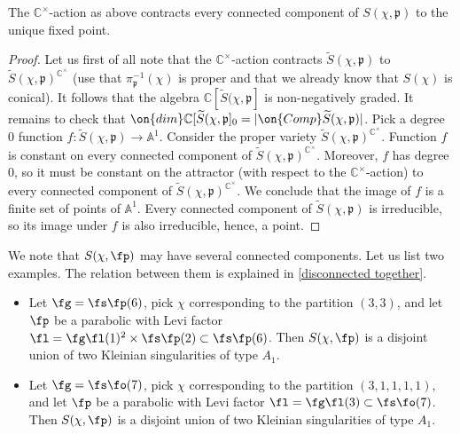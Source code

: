 \documentclass[12pt]{amsart}
\begin{document}
\begin{lemma}
The $\mathbb{C}^\times$-action as above contracts every connected component of $S(\chi,\mathfrak{p})$ to the unique fixed point. 
\end{lemma}
\begin{proof}
Let us first of all note that the $\mathbb{C}^\times$-action contracts $\widetilde{S}(\chi,\mathfrak{p})$ to $\widetilde{S}(\chi,\mathfrak{p})^{\mathbb{C}^\times}$ (use that $\pi_{\mathfrak{p}}^{-1}(\chi)$ is proper and that we already know that $S(\chi)$ is conical). It follows that the algebra $\mathbb{C}[\widetilde{S}(\chi,\mathfrak{p}]$ is non-negatively graded. It remains to check that $\on{dim}\mathbb{C}[\widetilde{S}(\chi,\mathfrak{p}]_0 = |\on{Comp}\widetilde{S}(\chi,\mathfrak{p})|$. Pick  a degree $0$ function $f\colon \widetilde{S}(\chi,\mathfrak{p}) \rightarrow \mathbb{A}^1$. Consider the proper variety $\widetilde{S}(\chi,\mathfrak{p})^{\mathbb{C}^\times}$. Function $f$ is constant on every connected component of $\widetilde{S}(\chi,\mathfrak{p})^{\mathbb{C}^\times}$. Moreover, $f$ has degree $0$, so it must be constant on the attractor (with respect to the $\mathbb{C}^\times$-action) to every connected component of $\widetilde{S}(\chi,\mathfrak{p})^{\mathbb{C}^\times}$. We conclude that the image of $f$ is a finite set of points of $\mathbb{A}^1$. Every connected component of $\widetilde{S}(\chi,\mathfrak{p})$ is irreducible, so its image under $f$ is also irreducible, hence, a point.
\end{proof}

\begin{rmk}\label{disconnected}
    We note that $S(\chi, \fp)$ may have several connected components. Let us list two examples. The relation between them is explained in \cref{disconnected together}.
    \begin{itemize}
        \item[1)] Let $\fg=\fs\fp(6)$, pick $\chi$ corresponding to the partition $(3,3)$, and let $\fp$ be a parabolic with Levi factor $\fl=\fg\fl(1)^2\times \fs\fp(2)\subset \fs\fp(6)$. Then $S(\chi, \fp)$ is a disjoint union of two Kleinian singularities of type $A_1$.
        \item[2)] Let $\fg=\fs\fo(7)$, pick $\chi$ corresponding to the partition $(3,1,1,1,1)$, and let $\fp$ be a parabolic with Levi factor $\fl=\fg\fl(3)\subset \fs\fo(7)$. Then $S(\chi, \fp)$ is a disjoint union of two Kleinian singularities of type $A_1$.
    \end{itemize}
\end{rmk}
\end{document}

